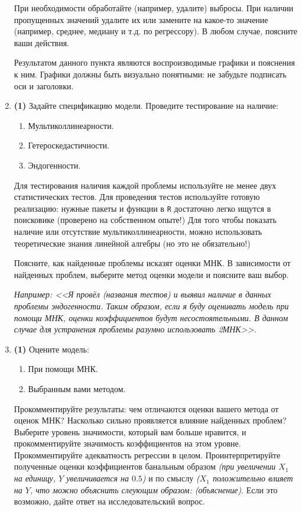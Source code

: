 \documentclass[10pt, a4paper]{extarticle}
\newcommand{\code}[1]{{\tt #1}}
\begin{document}
\begin{enumerate}
	При необходимости обработайте (например, удалите) выбросы. При наличии пропущенных значений удалите их или замените на какое-то значение (например, среднее, медиану и т.д. по регрессору). В любом случае, поясните ваши действия.
	
	Результатом данного пункта являются воспроизводимые графики и пояснения к ним. Графики должны быть визуально понятными: не забудьте подписать оси и заголовки. 
	
	\item \textbf{(1)} Задайте спецификацию модели. Проведите тестирование на наличие:
	\begin{enumerate}
		\item Мультиколлинеарности.
		\item Гетероскедастичности.
		\item Эндогенности.
	\end{enumerate}
	Для тестирования наличия каждой проблемы используйте не менее двух статистических тестов. Для проведения тестов используйте готовую реализацию: нужные пакеты и функции в \code{R} достаточно легко ищутся в поисковике (проверено на собственном опыте!) Для того чтобы показать наличие или отсутствие мультиколлинеарности, можно использовать теоретические знания линейной алгебры (но это не обязательно!)
	
	Поясните, как найденные проблемы исказят оценки МНК. В зависимости от найденных проблем, выберите метод оценки модели и поясните ваш выбор.
	
	\textit{Например: <<Я провёл (названия тестов) и выявил наличие в данных проблемы эндогенности. Таким образом, если я буду оценивать модель при помощи МНК, оценки коэффициентов будут несостоятельными. В данном случае для устранения проблемы разумно использовать 2МНК>>.}
	
	\item \textbf{(1)} Оцените модель:
	\begin{enumerate}
		\item При помощи МНК.
		\item Выбранным вами методом.
	\end{enumerate}
	Прокомментируйте результаты: чем отличаются оценки вашего метода от оценок МНК? Насколько сильно проявляется влияние найденных проблем? Выберите уровень значимости, который вам больше нравится, и прокомментируйте значимость коэффициентов на этом уровне. Прокомментируйте адекватность регрессии в целом. Проинтерпретируйте полученные оценки коэффициентов банальным образом \textit{(при увеличении $X_1$ на единицу, $Y$ увеличивается на $0.5$)} и по смыслу \textit{($X_1$ положительно влияет на $Y$, что можно объяснить слеующим образом: (объяснение)}. Если это возможно, дайте ответ на исследовательский вопрос.
	

\end{enumerate}
\end{document}
